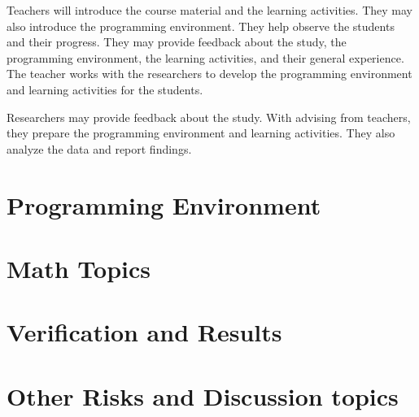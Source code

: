 \documentclass[12pt]{article}
\begin{document}
Teachers will introduce the course material and the learning activities. They may also introduce the programming environment. They help observe the students and their progress. They may provide feedback about the study, the programming environment, the learning activities, and their general experience. The teacher works with the researchers to develop the programming environment and learning activities for the students.

Researchers may provide feedback about the study. With advising from teachers, they prepare the programming environment and learning activities. They also analyze the data and report findings.


\section*{Programming Environment}

\section*{Math Topics}

\section*{Verification and Results}

\section*{Other Risks and Discussion topics}
\end{document}
